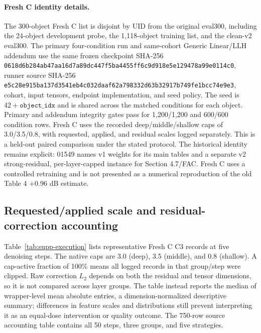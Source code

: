 \documentclass[11pt]{article}
\begin{document}
\paragraph{Fresh C identity details.} The 300-object Fresh C list is disjoint by UID from the original eval300, including the 24-object development probe, the 1,118-object training list, and the clean-v2 eval300. The primary four-condition run and same-cohort Generic Linear/LLH addendum use the same frozen checkpoint SHA-256 \texttt{0618d6b2\allowbreak{}84ab47aa\allowbreak{}16d7a89d\allowbreak{}c447f5ba\allowbreak{}4455ff6c\allowbreak{}9d918e5e\allowbreak{}129478a9\allowbreak{}9e0114c0}, runner source SHA-256 \texttt{e5c28e915ba137d3541eb4c032daaf62a798332d63b32917b749fe1bcc74e9e3}, cohort, input tensors, endpoint implementation, and seed policy. The seed is $42+\texttt{object\_idx}$ and is shared across the matched conditions for each object. Primary and addendum integrity gates pass for 1,200/1,200 and 600/600 condition rows. Fresh C uses the recorded deep/middle/shallow caps of 3.0/3.5/0.8, with requested, applied, and residual scales logged separately. This is a held-out paired comparison under the stated protocol. The historical identity remains explicit: 01549 names v1 weights for its main tables and a separate v2 strong-residual, per-layer-capped instance for Section 4.7/FAC. Fresh C uses a controlled retraining and is not presented as a numerical reproduction of the old Table 4 $+0.96$ dB estimate.

\subsection*{Requested/applied scale and residual-correction accounting}
Table~\ref{tab:supp-execution} lists representative Fresh C C3 records at five denoising steps. The native caps are 3.0 (deep), 3.5 (middle), and 0.8 (shallow). A cap-active fraction of 100\% means all logged records in that group/step were clipped. Raw correction $L_2$ depends on both the residual and tensor dimensions, so it is not compared across layer groups. The table instead reports the median of wrapper-level mean absolute entries, a dimension-normalized descriptive summary; differences in feature scales and distributions still prevent interpreting it as an equal-dose intervention or quality outcome. The 750-row source accounting table contains all 50 steps, three groups, and five strategies.
\end{document}
